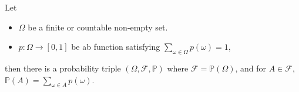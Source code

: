 \begin{theorem}
\normalfont 
Let
\begin{itemize}
    \item $\Omega$ be a finite or countable non-empty set.
    \item $p: \Omega \to [0,1]$ be ab function satisfying $\sum\limits_{\omega \in \Omega} p(\omega) = 1$,
\end{itemize}
then there is a probability triple $(\Omega, \mathcal{F}, \mathbb{P})$ where $\mathcal{F} = \mathbb{P}(\Omega)$, and for $A \in \mathcal{F}$, $\mathbb{P}(A) = \sum\limits_{\omega \in A}p(\omega)$.
\end{theorem}
